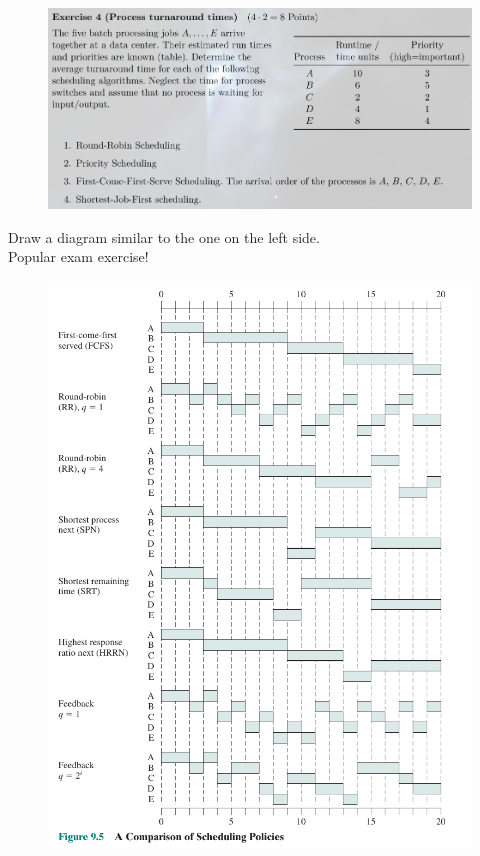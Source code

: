\documentclass[10pt]{beamer}
\begin{document}
\begin{frame}[allowframebreaks]{}
        \begin{minipage}{0.49\textwidth}
         \begin{figure}
          \includegraphics[keepaspectratio, width=\textwidth, height=\textheight]{img/103_ex3.png} \\
        \end{figure}
        Draw a diagram similar to the one on the left side. \\
        Popular exam exercise!
        \end{minipage} \begin{minipage}{0.49\textwidth}
        \begin{figure}
          \includegraphics[keepaspectratio, width=\textwidth, height=\textheight]{img/103_sched.png} \\
        \end{figure}
        \end{minipage}
        \framebreak 
        

\end{frame}
\end{document}

